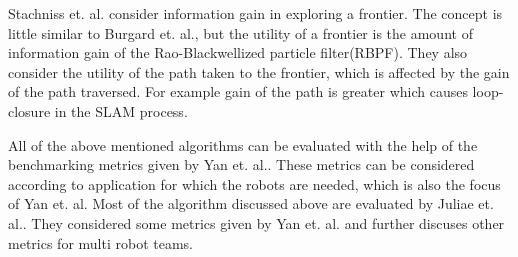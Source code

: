Stachniss et. al.\cite{Stachniss2005} consider information gain in exploring a frontier. The concept
is little similar to Burgard et. al., but the utility of a frontier is the amount of information
gain of the Rao-Blackwellized particle filter(RBPF). They also consider the utility of the path
taken to the frontier, which is affected by the gain of the path traversed. For example gain of the
path is greater which causes loop-closure in the SLAM process. \par

All of the above mentioned algorithms can be evaluated with the help of the benchmarking metrics
given by Yan et. al.\cite{Yan2015}. These metrics can be considered according to application for
which the robots are needed, which is also the focus of Yan et. al. Most of the algorithm discussed
above are evaluated by Juliae et. al.\cite{Juliae2012}. They considered some metrics given by
Yan et. al. and further discuses other metrics for multi robot teams.
